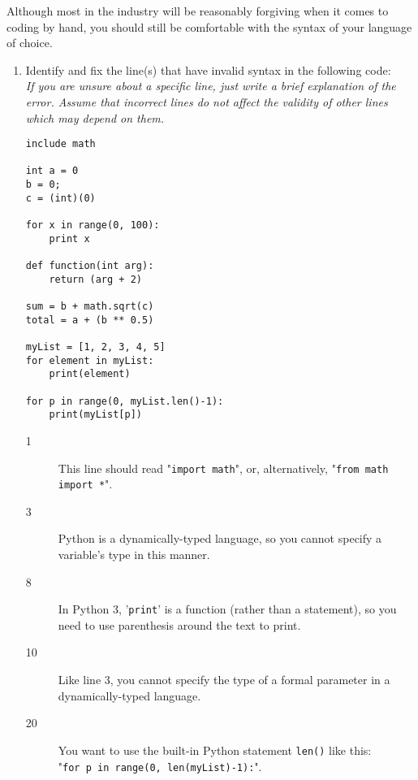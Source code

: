 Although most in the industry will be reasonably forgiving when it comes to coding by hand,
you should still be comfortable with the syntax of your language of choice.

\begin{enumerate}
\item Identify and fix the line(s) that have invalid syntax in the following code:\\
\emph{If you are unsure about a specific line, just write a brief explanation of the error. Assume that incorrect lines do not affect the validity of other lines which may depend on them.}
\begin{lstlisting}
include math

int a = 0
b = 0;
c = (int)(0)

for x in range(0, 100):
	print x

def function(int arg):
	return (arg + 2)

sum = b + math.sqrt(c)
total = a + (b ** 0.5)

myList = [1, 2, 3, 4, 5]
for element in myList:
	print(element)

for p in range(0, myList.len()-1):
	print(myList[p])
\end{lstlisting}

\begin{answer}
\begin{description}

	\item[1] This line should read "\texttt{import math}", or, alternatively, "\texttt{from math import *}".
	\item[3] Python is a dynamically-typed language, so you cannot specify a variable's type in this manner.
	\item[8] In Python 3, '\texttt{print}' is a function (rather than a statement), so you need to use parenthesis around the text to print.
	\item[10] Like line 3, you cannot specify the type of a formal parameter in a dynamically-typed language.
	\item[20] You want to use the built-in Python statement \texttt{len()} like this:\\
	 "\texttt{for p in range(0, len(myList)-1):}".

\end{description}
\end{answer}


\end{enumerate}
